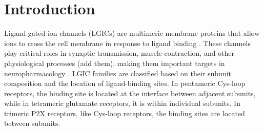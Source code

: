 \documentclass[pdflatex,sn-mathphys-num]{sn-jnl}%
\theoremstyle{thmstyleone}%
\theoremstyle{thmstyletwo}%
\theoremstyle{thmstylethree}%
\begin{document}
% 
% 
% 


\maketitle

\section{Introduction}\label{sec1}


Ligand-gated ion channels (LGICs) are multimeric membrane proteins that allow ions to cross the cell membrane in response to ligand binding \cite{p2x_cuerpo_humano}. These channels play critical roles in synaptic transmission, muscle contraction, and other physiological processes (add them), making them important targets in neuropharmacology \cite{p2x_drugs,therapeutic,p2x7_pharmacology}. LGIC families are classified based on their subunit composition and the location of ligand-binding sites. In pentameric Cys-loop receptors, the binding site is located at the interface between adjacent subunits, while in tetrameric glutamate receptors, it is within individual subunits. In trimeric P2X receptors, like Cys-loop receptors, the binding sites are located between subunits.
\end{document}
